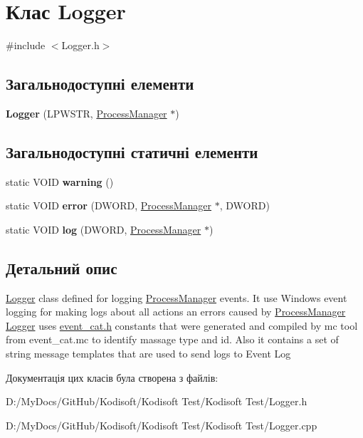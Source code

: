 \hypertarget{class_logger}{\section{Клас Logger}
\label{class_logger}
}


{\ttfamily \#include $<$Logger.\+h$>$}

\subsection*{Загальнодоступні елементи}
\begin{DoxyCompactItemize}
\item 
\hypertarget{class_logger_ad5976c5d766dc98681afeee715bfc9db}{{\bfseries Logger} (L\+P\+W\+S\+T\+R, \hyperlink{class_process_manager}{Process\+Manager} $\ast$)}\label{class_logger_ad5976c5d766dc98681afeee715bfc9db}

\end{DoxyCompactItemize}
\subsection*{Загальнодоступні статичні елементи}
\begin{DoxyCompactItemize}
\item 
\hypertarget{class_logger_aab36b3b942f3649646cc6a9868b5eacc}{static V\+O\+I\+D {\bfseries warning} ()}\label{class_logger_aab36b3b942f3649646cc6a9868b5eacc}

\item 
\hypertarget{class_logger_a4a18f512e2d977a9bcb98af5d56db1d1}{static V\+O\+I\+D {\bfseries error} (D\+W\+O\+R\+D, \hyperlink{class_process_manager}{Process\+Manager} $\ast$, D\+W\+O\+R\+D)}\label{class_logger_a4a18f512e2d977a9bcb98af5d56db1d1}

\item 
\hypertarget{class_logger_ae246b48011da71bcd9f734a367e7646e}{static V\+O\+I\+D {\bfseries log} (D\+W\+O\+R\+D, \hyperlink{class_process_manager}{Process\+Manager} $\ast$)}\label{class_logger_ae246b48011da71bcd9f734a367e7646e}

\end{DoxyCompactItemize}


\subsection{Детальний опис}
\hyperlink{class_logger}{Logger} class defined for logging \hyperlink{class_process_manager}{Process\+Manager} events. It use Windows event logging for making logs about all actions an errors caused by \hyperlink{class_process_manager}{Process\+Manager} \hyperlink{class_logger}{Logger} uses \hyperlink{event__cat_8h_source}{event\+\_\+cat.\+h} constants that were generated and compiled by mc tool from event\+\_\+cat.\+mc to identify massage type and id. Also it contains a set of string message templates that are used to send logs to Event Log 

Документація цих класів була створена з файлів\+:\begin{DoxyCompactItemize}
\item 
D\+:/\+My\+Docs/\+Git\+Hub/\+Kodisoft/\+Kodisoft Test/\+Kodisoft Test/Logger.\+h\item 
D\+:/\+My\+Docs/\+Git\+Hub/\+Kodisoft/\+Kodisoft Test/\+Kodisoft Test/Logger.\+cpp\end{DoxyCompactItemize}
